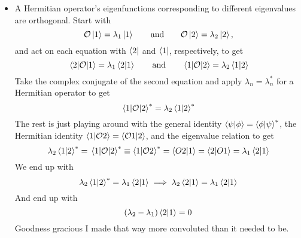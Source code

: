 \documentclass[11pt, a4paper]{article}
\newcommand{\eqtext}[1]{\qquad \text{#1} \qquad}
\newcommand{\Herm}{Hermitian\xspace}
\renewcommand{\O}{\mathcal{O}}  %
\newcommand{\p}{\psi}  %
\begin{document}
\begin{itemize}
	\item A \Herm operator's eigenfunctions corresponding to different eigenvalues are orthogonal. Start with
	\begin{equation*}
		\O \ket{1} = \lambda_{1}\ket{1} \eqtext{and} \O \ket{2} = \lambda_{2}\ket{2},
	\end{equation*}
	and act on each equation with $ \bra{2} $ and $ \bra{1} $, respectively, to get
	\begin{equation*}
		\mel{2}{\O}{1} = \lambda_{1}\braket{2}{1} \eqtext{and} \mel{1}{\O}{2} = \lambda_{2}\braket{1}{2}
	\end{equation*}
	Take the complex conjugate of the second equation and apply $ \lambda_{n} = \lambda_{n}^{*} $ for a \Herm operator to get 
	\begin{equation*}
		\mel{1}{\O}{2}^{*} = \lambda_{2}\braket{1}{2}^{*}
	\end{equation*}
	The rest is just playing around with the general identity $ \braket{\p}{\phi} = \braket{\phi}{\p}^{*} $, the \Herm identity $ \braket{1}{\O 2} = \braket{\O 1}{2} $, and the eigenvalue relation to get
	\begin{equation*}
		\lambda_{2}\braket{1}{2}^{*} = \mel{1}{\O}{2}^{*} \equiv \braket{1}{\O 2}^{*} = \braket{O2}{1} = \braket{2}{O1} = \lambda_{1}\braket{2}{1}
	\end{equation*}
	We end up with 
	\begin{equation*}
		\lambda_{2}\braket{1}{2}^{*} = \lambda_{1}\braket{2}{1} \implies \lambda_{2}\braket{2}{1} = \lambda_{1}\braket{2}{1}
	\end{equation*}
	And end up with 
	\begin{equation*}
		(\lambda_{2} - \lambda_{1}) \braket{2}{1} = 0
	\end{equation*}
	Goodness gracious I made that way more convoluted than it needed to be.
\end{itemize}
\end{document}
